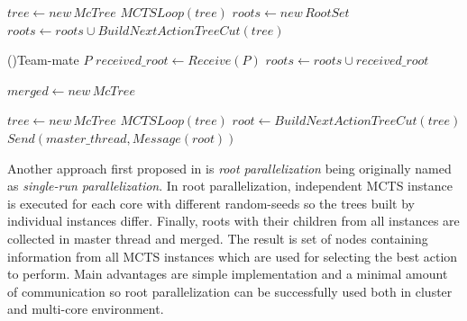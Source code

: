 \begin{algorithm}
\DontPrintSemicolon
\caption{$RootParallelizationMaster(random\_seed)$}
\label{alg_root_parallelization_master}

$tree \leftarrow new\,McTree$ \;
$MCTSLoop(tree)$ \;
$roots \leftarrow new\,RootSet$ \;
$roots \leftarrow roots \cup BuildNextActionTreeCut(tree)$ \;

\ForEach(){Team-mate $P$}{
    $received\_root \leftarrow Receive(P)$ \;
    $roots \leftarrow roots \cup received\_root$\;
}

 \;
$merged \leftarrow new\,McTree$ \;

 \;
\end{algorithm}

\begin{algorithm}
\DontPrintSemicolon
\caption{$RootParallelizationSlave(random\_seed,master\_thread)$}
\label{alg_root_parallelization_slave}
$tree \leftarrow new\,McTree$ \;
$MCTSLoop(tree)$ \;
$root \leftarrow BuildNextActionTreeCut(tree)$ \;
$Send(master\_thread, Message(root))$\;
\end{algorithm}

Another approach first proposed in \cite{Cazenave2007} is \emph{root parallelization} being
originally named as \emph{single-run parallelization}. In root parallelization, independent
MCTS instance is executed for each core with different random-seeds so the trees built by individual
instances differ. Finally, roots with their children from all instances are collected in master
thread and merged. The result is set of nodes containing information from all MCTS instances which
are used for selecting the best action to perform. Main advantages are simple implementation and a
minimal amount of communication so root parallelization can be successfully used both in cluster
and multi-core environment.

